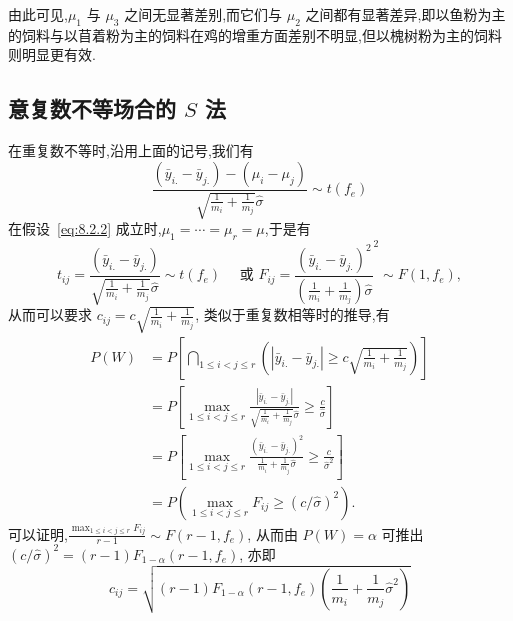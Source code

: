 由此可见,$\mu_1$ 与 $\mu_3$ 之间无显著差别,而它们与 $\mu_2$ 之间都有显著差异,即以鱼粉为主的饲料与以苜着粉为主的饲料在鸡的增重方面差别不明显,但以槐树粉为主的饲料则明显更有效.

\subsection[意复数不等场合的 S 法]{意复数不等场合的 $S$ 法}

在重复数不等时,沿用上面的记号,我们有
\begin{equation*}
  \frac{(\bar{y}_{i.} - \bar{y}_{j.}) - (\mu_i - \mu_j)}{\sqrt{\frac{1}{m_i}+\frac{1}{m_j}}\hat{\sigma}} \sim t(f_e)
\end{equation*}
在假设~\eqref{eq:8.2.2} 成立时,$\mu_1 = \cdots = \mu_r = \mu$,于是有
\begin{equation*}
  t_{ij} =   \frac{(\bar{y}_{i.} - \bar{y}_{j.})}{\sqrt{\frac{1}{m_i}+\frac{1}{m_j}}\hat{\sigma}} \sim t(f_e) \quad \text{ 或 } F_{ij} = \frac{(\bar{y}_{i.} - \bar{y}_{j.})^2}{\left(\frac{1}{m_i}+\frac{1}{m_j}\right)\hat{\sigma}}^2 \sim F(1, f_e),
\end{equation*}
从而可以要求 $c_{ij} = c \sqrt{\frac{1}{m_i}+\frac{1}{m_j}}$, 类似于重复数相等时的推导,有
\begin{align*}
  P(W) & = P \left[\bigcap_{1\leq i < j \leq r} \left(|\bar{y}_{i.} - \bar{y}_{j.}| \geq c \sqrt{\frac{1}{m_i}+\frac{1}{m_j}}\right)\right] \\
       & = P \left[\max_{1 \leq i < j \leq r} \frac{|\bar{y}_{i.} - \bar{y}_{j.}|}{\sqrt{\frac{1}{m_i}+\frac{1}{m_j}}\hat{\sigma}} \geq \frac{c}{\hat{\sigma}}\right] \\
       & = P \left[\max_{1 \leq i < j \leq r} \frac{(\bar{y}_{i.} - \bar{y}_{j.})^2}{\frac{1}{m_i}+\frac{1}{m_j}\hat{\sigma}} \geq \frac{c}{\hat{\sigma}^2}\right] \\
       & = P(\max_{1\leq i < j \leq r} F_{ij} \geq (c/\hat{\sigma})^2).
\end{align*}
可以证明,$\frac{\max_{1\leq i < j \leq r} F_{ij}}{r-1} \sim F(r-1, f_e)$, 从而由 $P(W)=\alpha$ 可推出 $(c/\hat{\sigma})^2 = (r-1) F_{1-\alpha} (r-1, f_e)$, 亦即
\begin{equation*}
  c_{ij} = \sqrt{(r-1) F_{1-\alpha}(r-1, f_e) \left(\frac{1}{m_i} + \frac{1}{m_j} \hat{\sigma}^2\right)}
\end{equation*}

